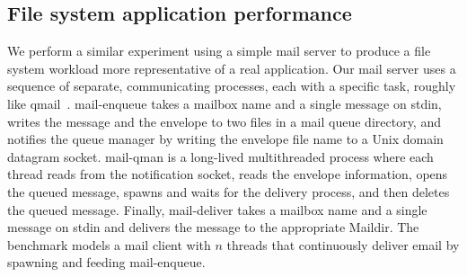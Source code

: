 \begin{comment}
The application could perform the name lookup once by a setting up a
stream socket at the beginning, and then using \code{send} to
communicate.  This setup results in better scalability (see the line
labeled ``Linux with $n$ streams''). But, in this setup, a spin
lock in the scheduler becomes a bottleneck (\XXX[FK]{double check}).
Clearly, Linux developers could remove these bottlenecks.  What is nice
about our approach is that the commutativity rule makes clear that these
locks can be removed and that \tool{} can catch these non-scalable
invocations that should be scalable.  \XXX[FK]{We should mention
somewhere that we have a model for unordered and ordered sockets.}

\begin{figure}
  \centering
  
  \caption{Scalability of $n$ clients concurrently sending and receiving 1
    byte messages to/from $n$ server  processes.}
  \label{fig:sockbench}
\end{figure}
\end{comment}


\subsection{File system application performance}
\label{sec:eval:app}

We perform a similar experiment using a simple mail server to
produce a file system workload more representative of a real
application.  Our mail server uses a sequence of separate, communicating
processes, each with a specific task, roughly like qmail~\cite{qmail}.
{mail-enqueue} takes a mailbox name and a single message on
stdin, writes the message and the envelope to two files in a
mail queue directory, and notifies the queue manager by writing the
envelope file
name to a Unix domain datagram socket.  {mail-qman} is a long-lived
multithreaded process where each thread reads from the notification
socket, reads the envelope information, opens the queued message, spawns
and waits for the delivery process, and then deletes the queued message.
Finally, {mail-deliver} takes a mailbox name and a single message
on stdin and delivers the message to the appropriate Maildir.
The benchmark models a mail client with $n$ threads that continuously
deliver email by spawning and feeding {mail-enqueue}.

